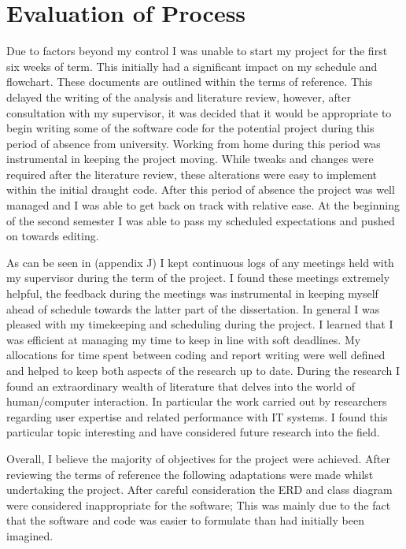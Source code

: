\section{Evaluation of Process}

Due to factors beyond my control I was unable to start my project for the first six weeks of term. This initially had a significant impact on my schedule and flowchart. These documents are outlined within the terms of reference. This delayed the writing of the analysis and literature review, however, after consultation with my supervisor, it was decided that it would be appropriate to begin writing some of the software code for the potential project during this period of absence from university. Working from home during this period was instrumental in keeping the project moving. While tweaks and changes were required after the literature review, these alterations were easy to implement within the initial draught code. After this period of absence the project was well managed and I was able to get back on track with relative ease. At the beginning of the second semester I was able to pass my scheduled expectations and pushed on towards editing.

As can be seen in (appendix J) I kept continuous logs of any meetings held with my supervisor during the term of the project. I found these meetings extremely helpful, the feedback during the meetings was instrumental in keeping myself ahead of schedule towards the latter part of the dissertation. In general I was pleased with my timekeeping and scheduling during the project. I learned that I was efficient at managing my time to keep in line with soft deadlines. My allocations for time spent between coding and report writing were well defined and helped to keep both aspects of the research up to date. During the research I found an extraordinary wealth of literature that delves into the world of human/computer interaction. In particular the work carried out by researchers regarding user expertise and related performance with IT systems. I found this particular topic interesting and have considered future research into the field.

Overall, I believe the majority of objectives for the project were achieved. After reviewing the terms of reference the following adaptations were made whilst undertaking the project. After careful consideration the ERD and class diagram were considered inappropriate for the software; This was mainly due to the fact that the software and code was easier to formulate than had initially been imagined.

